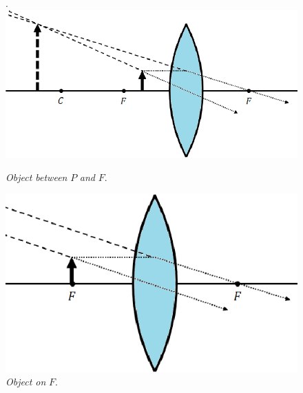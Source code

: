\documentclass{scrartcl}
\begin{document}
    \begin{figure}[H]
        \centering
        \begin{minipage}[b]{0.49\textwidth}.
        \includegraphics[width=\textwidth]{convex1.eps}
        \caption{\textit{Object between} $P$ \textit{and} $F$.}
        \end{minipage}
        \hfill
        \begin{minipage}[b]{0.49\textwidth}
            \includegraphics[width=\textwidth]{convex2.eps}
            \caption{\textit{Object on} $F$.}
        \end{minipage}
    \end{figure}
\end{document}
